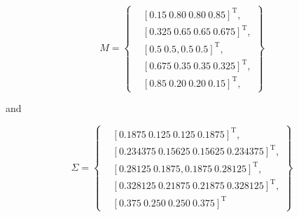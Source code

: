 

\begin{equation*}
	M = \left\{ \begin{aligned}
		& \left[ 0.15 ~ 0.80 ~ 0.80 ~ 0.85 \right]^{\mathrm{T}},\\ 
		& \left[ 0.325 ~ 0.65 ~ 0.65 ~ 0.675 \right]^{\mathrm{T}},\\
		& \left[ 0.5 ~ 0.5, 0.5 ~ 0.5 \right]^{\mathrm{T}},\\
		& \left[ 0.675 ~ 0.35 ~ 0.35 ~ 0.325 \right]^{\mathrm{T}},\\
		& \left[ 0.85 ~ 0.20 ~ 0.20 ~ 0.15 \right]^{\mathrm{T}},
	\end{aligned} \right\}
\end{equation*}

and

\begin{equation*}
	\Sigma = \left\{ \begin{aligned}
		& \left[ 0.1875 ~ 0.125 ~ 0.125 ~ 0.1875 \right]^{\mathrm{T}},\\ 
		& \left[ 0.234375 ~ 0.15625 ~ 0.15625 ~ 0.234375 \right]^{\mathrm{T}},\\
		& \left[ 0.28125 ~ 0.1875 , 0.1875 ~ 0.28125 \right]^{\mathrm{T}},\\
		& \left[ 0.328125 ~ 0.21875 ~ 0.21875 ~ 0.328125 \right]^{\mathrm{T}},\\
		& \left[ 0.375 ~ 0.250 ~ 0.250 ~ 0.375 \right]^{\mathrm{T}}
	\end{aligned} \right\}
\end{equation*}

